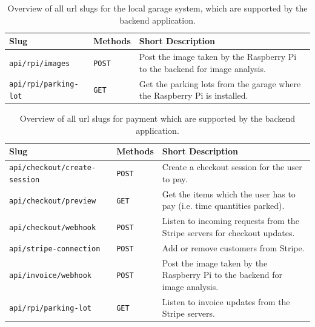 \begin{appendices}
\begin{table}[htp]
    \centering
    \begin{tabular}{|l|l|p{7cm}|}
        \hline
    \textbf{Slug} & \textbf{Methods} & \textbf{Short Description}  \\
    \hline
        \hline
        \texttt{api/rpi/images} &  \texttt{POST} & Post the image taken by the Raspberry Pi to the backend for image analysis.\\
        \hline
        \texttt{api/rpi/parking-lot} &  \texttt{GET} & Get the parking lots from the garage where the Raspberry Pi is installed.\\
        \hline
            \end{tabular}
    \caption{Overview of all \ac{url} slugs for the local garage system, which are supported by the backend application.}
    \label{tab:url-rpi}
\end{table}


\begin{table}[htp]
    \centering
    \begin{tabular}{|l|l|p{7cm}|}
        \hline
    \textbf{Slug} & \textbf{Methods} & \textbf{Short Description}  \\
    \hline
        \hline
        \texttt{api/checkout/create-session} &  \texttt{POST} & Create a checkout session for the user to pay.\\
        \hline
        \texttt{api/checkout/preview} &  \texttt{GET} & Get the items which the user has to pay (i.e. time quantities parked).\\
        \hline
        \texttt{api/checkout/webhook} &  \texttt{POST} & Listen to incoming requests from the Stripe servers for checkout updates.\\
        \hline
        \texttt{api/stripe-connection} &  \texttt{POST} & Add or remove customers from Stripe.\\
        \hline
        \texttt{api/invoice/webhook} &  \texttt{POST} & Post the image taken by the Raspberry Pi to the backend for image analysis.\\
        \hline
        \texttt{api/rpi/parking-lot} &  \texttt{GET} & Listen to invoice updates from the Stripe servers.\\
        \hline
    \end{tabular}
    \caption{Overview of all \ac{url} slugs for payment which are supported by the backend application.}
    \label{tab:url-payment}
\end{table}


\end{appendices}
